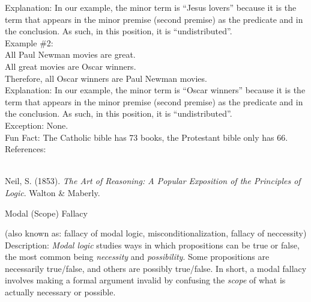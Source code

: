\documentclass[a4paper,12pt,single,pdftex]{scrbook}
\begin{document}
    
      Explanation: In our example, the minor term is “Jesus lovers” because it is the term that appears in the minor premise (second premise) as the predicate and in the conclusion.  As such, in this position, it is “undistributed”.
    \\

    
      Example \#2:
    \\

    
      All Paul Newman movies are great.
    \\

    
      All great movies are Oscar winners.
    \\

    
      Therefore, all Oscar winners are Paul Newman movies.
    \\

    
      Explanation: In our example, the minor term is “Oscar winners” because it is the term that appears in the minor premise (second premise) as the predicate and in the conclusion.  As such, in this position, it is “undistributed”.
    \\

    
      Exception: None.
    \\

    
      Fun Fact: The Catholic bible has 73 books, the Protestant bible only has 66.
    \\

    References:

    
      
        
      \\

      
        
          Neil, S. (1853). {\it The Art of Reasoning: A Popular Exposition of the Principles of Logic}. Walton \& Maberly.
        
      
    
  

Modal (Scope) Fallacy
    
      (also known as: fallacy of modal logic, misconditionalization, fallacy of neccessity)
    \\

  
    Description: {\it Modal logic} studies ways in which propositions can be true or false, the most common being {\it necessity} and {\it possibility}.  Some propositions are necessarily true/false, and others are possibly true/false.  In short, a modal fallacy involves making a formal argument invalid by confusing the {\it scope} of what is actually necessary or possible.
\end{document}
